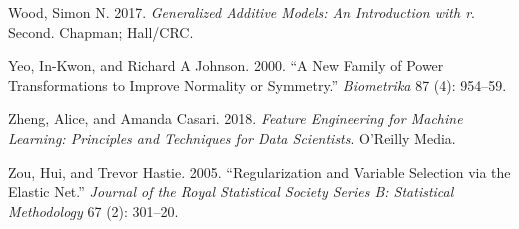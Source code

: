 \documentclass[
  letterpaper,
  DIV=11,
  numbers=noendperiod]{scrreprt}
\newlength{\cslhangindent}
\newenvironment{CSLReferences}[2] %
 {\begin{list}{}{%
  \setlength{\itemindent}{0pt}
  \setlength{\leftmargin}{0pt}
  \setlength{\parsep}{0pt}
  \ifodd #1
   \setlength{\leftmargin}{\cslhangindent}
   \setlength{\itemindent}{-1\cslhangindent}
  \fi
  \setlength{\itemsep}{#2\baselineskip}}}
 {\end{list}}
\begin{document}
\begin{CSLReferences}{1}{0}
Wood, Simon N. 2017. \emph{Generalized Additive Models: An Introduction
with r}. Second. Chapman; Hall/CRC.

Yeo, In-Kwon, and Richard A Johnson. 2000. {``A New Family of Power
Transformations to Improve Normality or Symmetry.''} \emph{Biometrika}
87 (4): 954--59.

Zheng, Alice, and Amanda Casari. 2018. \emph{Feature Engineering for
Machine Learning: Principles and Techniques for Data Scientists}.
O'Reilly Media.

Zou, Hui, and Trevor Hastie. 2005. {``Regularization and Variable
Selection via the Elastic Net.''} \emph{Journal of the Royal Statistical
Society Series B: Statistical Methodology} 67 (2): 301--20.

\end{CSLReferences}
\end{document}
